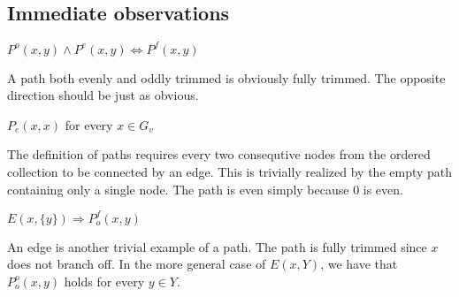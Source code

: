 \subsection{Immediate observations}
\label{sub:Immediate observations}
\begin{lemma}
  $P^o(x,y) \wedge P^e(x,y) \Leftrightarrow P^f(x,y)$
\end{lemma}
A path both evenly and oddly trimmed is obviously fully trimmed.
The opposite direction should be just as obvious.
\begin{lemma}
  $P_e(x,x)$ for every $x \in G_v$
\end{lemma}
The definition of paths requires every two consequtive nodes from the ordered collection to be connected by an edge.
This is trivially realized by the empty path containing only a single node.
The path is even simply because 0 is even.
\begin{lemma}
  $E(x,\{ y \}) \Rightarrow P^f_o(x,y)$
\end{lemma}
An edge is another trivial example of a path.
The path is fully trimmed since $x$ does not branch off.
In the more general case of $E(x,Y)$, we have that $P^o_o(x,y)$ holds for every $y \in Y$.
